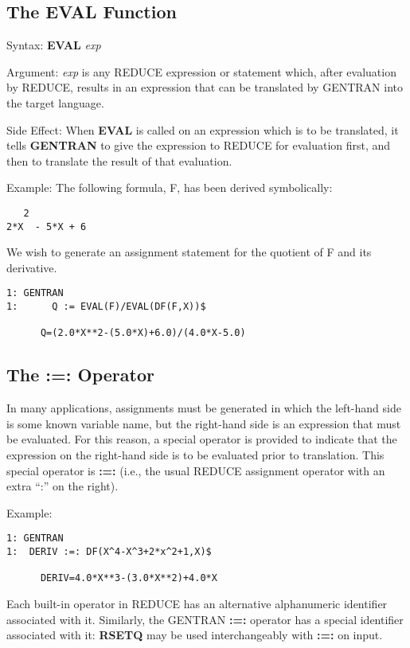 \subsection{The EVAL Function}
\label{eval}
\begin{describe}{Syntax:}
{\bf EVAL} {\it exp}
\end{describe}
\begin{describe}{Argument:}
{\it exp} is any REDUCE expression or statement which, after evaluation
by REDUCE, results in an expression that can be translated by
GENTRAN into the target language.
\end{describe}
\begin{describe}{Side Effect:}
When {\bf EVAL} is called on an expression which is to be translated, it
tells {\bf GENTRAN} to give the expression to REDUCE
for evaluation first, and then to translate the result of that evaluation.
\end{describe}
\begin{describe}{Example:}
The following formula, F, has been derived symbolically:
\begin{verbatim}
   2
2*X  - 5*X + 6
\end{verbatim}
We wish to generate an assignment statement for the quotient
of F and its derivative.
\begin{verbatim}
1: GENTRAN 
1:      Q := EVAL(F)/EVAL(DF(F,X))$ 

      Q=(2.0*X**2-(5.0*X)+6.0)/(4.0*X-5.0)
\end{verbatim}
\end{describe}
\subsection{The :=: Operator}
\label{rsetq}
In many applications, assignments must be generated in which the
left-hand side is some known variable name, but the
right-hand side is an expression that must be evaluated.  For
this reason, a special operator is provided to indicate that the expression
on the right-hand side is to be evaluated prior to translation.  This
special operator is {\bf :=:} (i.e., the usual REDUCE assignment operator
with an extra ``:'' on the right).
\begin{describe}{Example:}
\begin{verbatim}
1: GENTRAN 
1:  DERIV :=: DF(X^4-X^3+2*x^2+1,X)$ 

      DERIV=4.0*X**3-(3.0*X**2)+4.0*X
\end{verbatim}
\end{describe}
Each built-in operator in REDUCE has an alternative alphanumeric identifier
associated with it.  Similarly, the GENTRAN {\bf :=:} operator has a
special identifier associated with it: {\bf RSETQ} may be used
interchangeably with {\bf :=:} on input.

